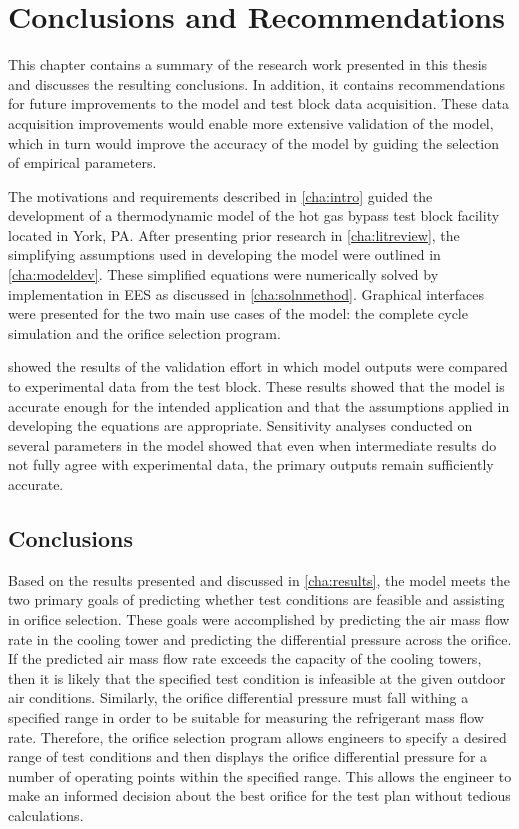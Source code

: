 \chapter{Conclusions and Recommendations} \label{cha:conclusion}
This chapter contains a summary of the research work presented in this thesis
and discusses the resulting conclusions.
In addition, it contains recommendations for future improvements to the model
and test block data acquisition.
These data acquisition improvements would enable more extensive validation of the model, 
which in turn would improve the accuracy of the model by guiding the selection
of empirical parameters.

The motivations and requirements described in \cref{cha:intro} guided the development
of a thermodynamic model of the  hot gas bypass test block
facility located in York, PA.
After presenting prior research in \cref{cha:litreview}, the simplifying assumptions 
used in developing the model were outlined in \cref{cha:modeldev}.
These simplified equations were numerically solved by implementation
in EES as discussed in \cref{cha:solnmethod}.
Graphical interfaces were presented for the two main use cases of the model:
the complete cycle simulation and the orifice selection program.

 showed the results of the validation effort
in which model outputs were compared to experimental data from the test block.
These results showed that the model is accurate enough for the intended application
and that the assumptions applied in developing the equations are appropriate.
Sensitivity analyses conducted on several parameters in the model showed that
even when intermediate results do not fully agree with experimental data,
the primary outputs remain sufficiently accurate.

\section{Conclusions} \label{sec:conclusions}
Based on the results presented and discussed in \cref{cha:results},
the model meets the two primary goals of predicting whether test conditions
are feasible and assisting in orifice selection.
These goals were accomplished by predicting the air mass flow rate in the
cooling tower and predicting the differential pressure across the orifice.
If the predicted air mass flow rate exceeds the capacity of the cooling towers,
then it is likely that the specified test condition is infeasible at the given
outdoor air conditions.
Similarly, the orifice differential pressure must fall withing a specified range
in order to be suitable for measuring the refrigerant mass flow rate.
Therefore, the orifice selection program allows engineers to specify
a desired range of test conditions and
then displays the orifice differential pressure for 
a number of operating points within the specified range.
This allows the engineer to make an informed decision about the best orifice 
for the test plan without tedious calculations.

